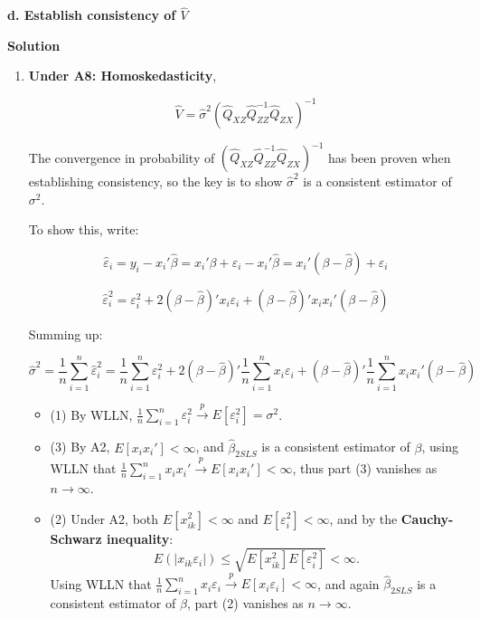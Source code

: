 \documentclass[12pt, oneside]{article}
\begin{document}
\textbf{d. Establish consistency of \( \hat{V} \)}

\textbf{Solution}

\begin{enumerate}
    \item 
\textbf{Under A8: Homoskedasticity}, 

\[
\hat{V} = \hat{\sigma}^2 (\hat{Q}_{XZ} \hat{Q}_{ZZ}^{-1} \hat{Q}_{ZX})^{-1}
\]

The convergence in probability of \( (\hat{Q}_{XZ} \hat{Q}_{ZZ}^{-1} \hat{Q}_{ZX})^{-1} \) has been proven when establishing consistency, so the key is to show \( \hat{\sigma}^2 \) is a consistent estimator of \( \sigma^2 \).

To show this, write:

\[
\hat{\varepsilon}_i = y_i - x_i' \hat{\beta} = x_i' \beta + \varepsilon_i - x_i' \hat{\beta} = x_i' (\beta - \hat{\beta}) + \varepsilon_i
\]

\[
\hat{\varepsilon}_i^2 = \varepsilon_i^2 + 2(\beta - \hat{\beta})' x_i \varepsilon_i + (\beta - \hat{\beta})' x_i x_i' (\beta - \hat{\beta})
\]

Summing up:

\[
\hat{\sigma}^2 = \frac{1}{n} \sum_{i=1}^{n} \hat{\varepsilon}_i^2 = \frac{1}{n} \sum_{i=1}^{n} \varepsilon_i^2 
+ 2(\beta - \hat{\beta})' \frac{1}{n} \sum_{i=1}^{n} x_i \varepsilon_i 
+ (\beta - \hat{\beta})' \frac{1}{n} \sum_{i=1}^{n} x_i x_i' (\beta - \hat{\beta})
\]

\begin{itemize}
    \item (1) By WLLN, \( \frac{1}{n} \sum_{i=1}^{n} \varepsilon_i^2 \xrightarrow{p} E[\varepsilon_i^2] = \sigma^2 \).
    \item (3) By A2, \( E[x_i x_i'] < \infty \), and \( \hat{\beta}_{2SLS} \) is a consistent estimator of \( \beta \), using WLLN that \( \frac{1}{n} \sum_{i=1}^{n} x_i x_i' \xrightarrow{p} E[x_i x_i'] < \infty \), thus part (3) vanishes as \( n \to \infty \).
    \item (2) Under A2, both \( E[x_{ik}^2] < \infty \) and \( E[\varepsilon_i^2] < \infty \), and by the \textbf{Cauchy-Schwarz inequality}:
    \[
    E(|x_{ik} \varepsilon_i|) \leq \sqrt{E[x_{ik}^2] E[\varepsilon_i^2]} < \infty.
    \]
    Using WLLN that \( \frac{1}{n} \sum_{i=1}^{n} x_i \varepsilon_i \xrightarrow{p} E[x_i \varepsilon_i] < \infty \), and again \( \hat{\beta}_{2SLS} \) is a consistent estimator of \( \beta \), part (2) vanishes as \( n \to \infty \).
\end{itemize}


\end{enumerate}
\end{document}
